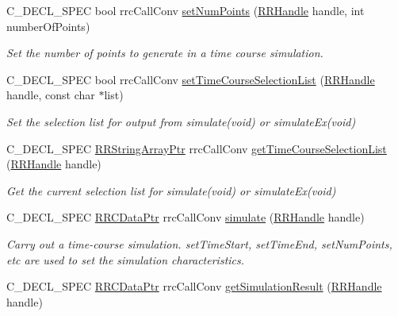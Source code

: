 \begin{DoxyCompactItemize}
C\+\_\+\+D\+E\+C\+L\+\_\+\+S\+P\+E\+C bool rrc\+Call\+Conv \hyperlink{group__simulation_ga4575f315d9794b53adf78bfb60973d58}{set\+Num\+Points} (\hyperlink{rrc__types_8h_a1d68f0592372208fa5a5f2799ea4b3ae}{R\+R\+Handle} handle, int number\+Of\+Points)
\begin{DoxyCompactList}\small\item\em Set the number of points to generate in a time course simulation. \end{DoxyCompactList}\item 
C\+\_\+\+D\+E\+C\+L\+\_\+\+S\+P\+E\+C bool rrc\+Call\+Conv \hyperlink{group__simulation_ga61cca45bb48776d12f5bcc52d0c77e04}{set\+Time\+Course\+Selection\+List} (\hyperlink{rrc__types_8h_a1d68f0592372208fa5a5f2799ea4b3ae}{R\+R\+Handle} handle, const char $\ast$list)
\begin{DoxyCompactList}\small\item\em Set the selection list for output from simulate(void) or simulate\+Ex(void) \end{DoxyCompactList}\item 
C\+\_\+\+D\+E\+C\+L\+\_\+\+S\+P\+E\+C \hyperlink{rrc__types_8h_a7c9475df6c7337d99482b13a365e7596}{R\+R\+String\+Array\+Ptr} rrc\+Call\+Conv \hyperlink{group__simulation_gab58d3101cad36a26f0d421e64cf0d0f6}{get\+Time\+Course\+Selection\+List} (\hyperlink{rrc__types_8h_a1d68f0592372208fa5a5f2799ea4b3ae}{R\+R\+Handle} handle)
\begin{DoxyCompactList}\small\item\em Get the current selection list for simulate(void) or simulate\+Ex(void) \end{DoxyCompactList}\item 
C\+\_\+\+D\+E\+C\+L\+\_\+\+S\+P\+E\+C \hyperlink{rrc__types_8h_a9da8b124eb9c3c0045f8926c6a420b4a}{R\+R\+C\+Data\+Ptr} rrc\+Call\+Conv \hyperlink{group__simulation_ga9ac99f6909eb0a6244035fc9cdeff94d}{simulate} (\hyperlink{rrc__types_8h_a1d68f0592372208fa5a5f2799ea4b3ae}{R\+R\+Handle} handle)
\begin{DoxyCompactList}\small\item\em Carry out a time-\/course simulation. set\+Time\+Start, set\+Time\+End, set\+Num\+Points, etc are used to set the simulation characteristics. \end{DoxyCompactList}\item 
C\+\_\+\+D\+E\+C\+L\+\_\+\+S\+P\+E\+C \hyperlink{rrc__types_8h_a9da8b124eb9c3c0045f8926c6a420b4a}{R\+R\+C\+Data\+Ptr} rrc\+Call\+Conv \hyperlink{group__simulation_gaa52283eaebe340a4a39cc4900441be93}{get\+Simulation\+Result} (\hyperlink{rrc__types_8h_a1d68f0592372208fa5a5f2799ea4b3ae}{R\+R\+Handle} handle)

\end{DoxyCompactItemize}
